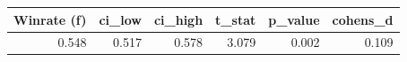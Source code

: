 \begin{tabular}{rrrrrr}
\toprule
Winrate (f) & ci\_low & ci\_high & t\_stat & p\_value & cohens\_d \\
\midrule
0.548 & 0.517 & 0.578 & 3.079 & 0.002 & 0.109 \\
\bottomrule
\end{tabular}
